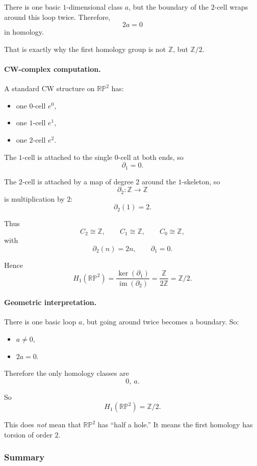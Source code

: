 \documentclass[12pt,a4paper]{article}
\theoremstyle{notespace}
\begin{document}
There is one basic \(1\)-dimensional class \(a\), but the boundary of the \(2\)-cell wraps around this loop twice. Therefore,
\[
2a=0
\]
in homology.

That is exactly why the first homology group is not \(\mathbb Z\), but \(\mathbb Z/2\).

\paragraph{CW-complex computation.}
A standard CW structure on \(\mathbb{RP}^2\) has:

\begin{itemize}
	\item one \(0\)-cell \(e^0\),
	\item one \(1\)-cell \(e^1\),
	\item one \(2\)-cell \(e^2\).
\end{itemize}

The \(1\)-cell is attached to the single \(0\)-cell at both ends, so
\[
\partial_1=0.
\]

The \(2\)-cell is attached by a map of degree \(2\) around the \(1\)-skeleton, so
\[
\partial_2:\mathbb Z\to \mathbb Z
\]
is multiplication by \(2\):
\[
\partial_2(1)=2.
\]

Thus
\[
C_2\cong \mathbb Z,\qquad C_1\cong \mathbb Z,\qquad C_0\cong \mathbb Z,
\]
with
\[
\partial_2(n)=2n,\qquad \partial_1=0.
\]

Hence
\[
H_1(\mathbb{RP}^2)
=
\frac{\ker(\partial_1)}{\operatorname{im}(\partial_2)}
=
\frac{\mathbb Z}{2\mathbb Z}
=
\mathbb Z/2.
\]

\paragraph{Geometric interpretation.}
There is one basic loop \(a\), but going around twice becomes a boundary. So:

\begin{itemize}
	\item \(a\neq 0\),
	\item \(2a=0\).
\end{itemize}

Therefore the only homology classes are
\[
0,\ a.
\]

So
\[
H_1(\mathbb{RP}^2)=\mathbb Z/2.
\]

This does \emph{not} mean that \(\mathbb{RP}^2\) has ``half a hole.'' It means the first homology has torsion of order \(2\).

\subsubsection{Summary}
\end{document}
